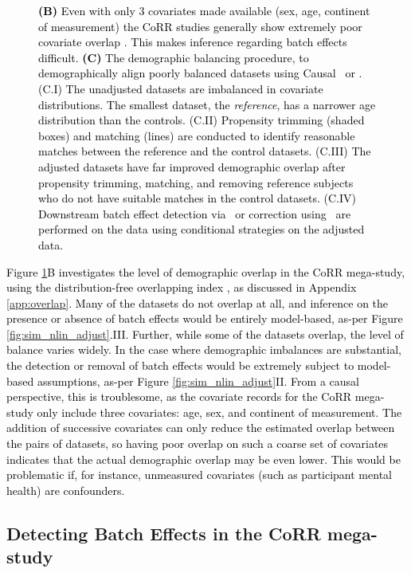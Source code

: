 \begin{figure}[h]
{    \textcolor{black}{\textbf{(B)} Even with only $3$ covariates made available (sex, age, continent of measurement) the CoRR studies generally show extremely poor covariate overlap \cite{Pastore2019}. This makes inference regarding batch effects difficult. \textbf{(C)} The demographic balancing procedure, to demographically align poorly balanced datasets using Causal \Dcorr~or \cccombat. (C.I) The unadjusted datasets are imbalanced in covariate distributions. The smallest dataset, the \textit{reference}, has a narrower age distribution than the controls. (C.II) Propensity trimming (shaded boxes) and matching (lines) are conducted to identify reasonable matches between the reference and the control datasets. (C.III) The adjusted datasets have far improved demographic overlap after propensity trimming, matching, and removing reference subjects who do not have suitable matches in the control datasets. (C.IV) Downstream batch effect detection via \Dcorr~or correction using \Combat~are performed on the data using conditional strategies on the adjusted data.}}
    \label{fig:demographic}
\end{figure}

\textcolor{black}{Figure \ref{fig:demographic}B investigates the level of demographic overlap in the CoRR mega-study, using the distribution-free overlapping index \cite{Pastore2019}, as discussed in Appendix \ref{app:overlap}. Many of the datasets do not overlap at all, and inference on the presence or absence of batch effects would be entirely model-based, as-per Figure \ref{fig:sim_nlin_adjust}.III. Further, while some of the datasets overlap, the level of balance varies widely. In the case where demographic imbalances are substantial, the detection or removal of batch effects would be extremely subject to model-based assumptions, as-per Figure \ref{fig:sim_nlin_adjust}II. From a causal perspective, this is troublesome, as the covariate records for the CoRR mega-study only include three covariates: age, sex, and continent of measurement. The addition of successive covariates can only reduce the estimated overlap between the pairs of datasets, so having poor overlap on such a coarse set of covariates indicates that the actual demographic overlap may be even lower. This would be problematic if, for instance, unmeasured covariates (such as participant mental health) are confounders.}

\subsection{Detecting Batch Effects in the CoRR mega-study}

